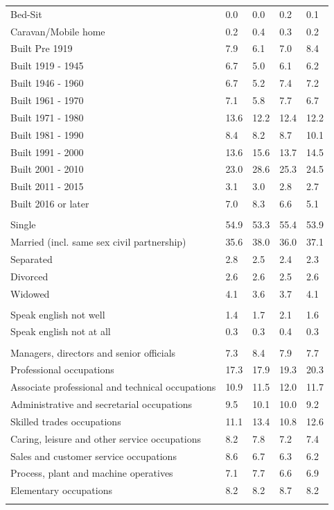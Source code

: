 \documentclass{article}
\begin{document}
\begin{table}[h]
\begin{tabular}{KTTTT}
Bed-Sit & 0.0& 0.0& 0.2& 0.1\\
Caravan/Mobile home & 0.2& 0.4& 0.3& 0.2\\
    \hline
Built Pre 1919 & 7.9& 6.1& 7.0& 8.4\\
Built 1919 - 1945 & 6.7& 5.0& 6.1& 6.2\\
Built  1946 - 1960 & 6.7& 5.2& 7.4& 7.2\\
Built  1961 - 1970 & 7.1& 5.8& 7.7& 6.7\\
Built  1971 - 1980 & 13.6& 12.2& 12.4& 12.2\\
Built  1981 - 1990 &  8.4&  8.2&  8.7& 10.1\\
Built  1991 - 2000 & 13.6& 15.6& 13.7& 14.5\\
Built  2001 - 2010 & 23.0& 28.6& 25.3& 24.5\\
Built  2011 - 2015 & 3.1& 3.0& 2.8& 2.7\\
Built  2016 or later & 7.0& 8.3& 6.6& 5.1\\
\hline
    \\
    \hline
Single & 54.9& 53.3& 55.4& 53.9\\
Married (incl. same sex civil partnership) & 35.6& 38.0& 36.0& 37.1\\
Separated  & 2.8& 2.5& 2.4& 2.3\\
Divorced  & 2.6& 2.6& 2.5& 2.6\\
Widowed & 4.1& 3.6& 3.7& 4.1\\
\hline
    \\ 
    \hline
Speak english not well & 1.4& 1.7& 2.1& 1.6\\
Speak english not at all & 0.3& 0.3& 0.4& 0.3\\
\hline
    \\
    \hline
Managers, directors and senior officials & 7.3& 8.4& 7.9& 7.7\\
Professional occupations & 17.3& 17.9& 19.3& 20.3\\
Associate professional and technical occupations & 10.9& 11.5& 12.0& 11.7\\
Administrative and secretarial occupations &  9.5& 10.1& 10.0&  9.2\\
Skilled trades occupations & 11.1& 13.4& 10.8& 12.6\\
Caring, leisure and other service occupations & 8.2& 7.8& 7.2& 7.4\\
Sales and customer service occupations & 8.6& 6.7& 6.3& 6.2\\
Process, plant and machine operatives & 7.1& 7.7& 6.6& 6.9\\
Elementary occupations & 8.2& 8.2& 8.7& 8.2\\
\hline
\end{tabular}
\end{table}
\end{document}
